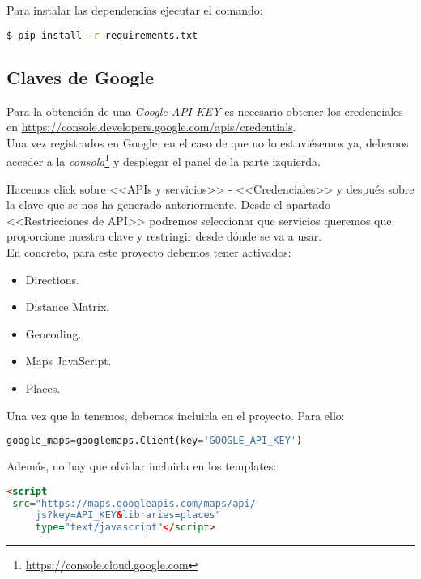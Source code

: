 Para instalar las dependencias ejecutar el comando:
\begin{lstlisting}[language=bash,caption={Instalar requirements.txt}]
$ pip install -r requirements.txt
\end{lstlisting}

\subsection{Claves de Google}
Para la obtención de una \textit{Google API KEY} es necesario obtener los credenciales en  \url{https://console.developers.google.com/apis/credentials}.\\
Una vez registrados en Google, en el caso de que no lo estuviésemos ya, debemos acceder a la \textit{consola}\footnote{\url{https://console.cloud.google.com}} y desplegar el panel de la parte izquierda.

Hacemos click sobre <<APIs y servicios>> - <<Credenciales>> y después sobre la clave que se nos ha generado anteriormente. Desde el apartado <<Restricciones de API>> podremos seleccionar que servicios queremos que proporcione nuestra clave y restringir desde dónde se va a usar.\\
En concreto, para este proyecto debemos tener activados:
\begin{itemize}
	\item Directions.
	\item Distance Matrix.
	\item Geocoding.
	\item Maps JavaScript.
	\item Places.
\end{itemize}


Una vez que la tenemos, debemos incluirla en el proyecto. Para ello:
\renewcommand{\lstlistingname}{Google Key}%
\renewcommand{\lstlistlistingname}{List of \lstlistingname s}
\begin{lstlisting}[language=python,caption={Añadir \texttt{API\_KEY}}]
google_maps=googlemaps.Client(key='GOOGLE_API_KEY')
\end{lstlisting}

Además, no hay que olvidar incluirla en los templates:
\begin{lstlisting}[language=html,caption={Añadir \texttt{API\_KEY} a los templates}]
<script
 src="https://maps.googleapis.com/maps/api/
	 js?key=API_KEY&libraries=places" 
	 type="text/javascript"</script>
\end{lstlisting}

